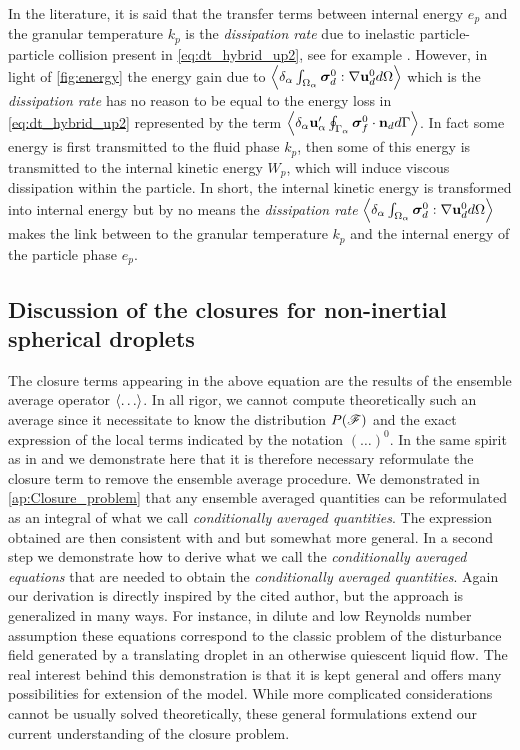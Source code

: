 In the literature, it is said that the transfer terms between internal energy $e_p$ and the granular temperature $k_p$ is the \textit{dissipation rate} due to inelastic particle-particle collision present in \ref{eq:dt_hybrid_up2}, see for example \citet{fox2014multiphase,rao2008introduction}. 
However, in light of \ref{fig:energy} the energy gain due to  $\left<\delta_\alpha \int_{\Omega_{\alpha}} \bm{\sigma}_d^0:\mathbf{\nabla} \textbf{u}_d^0 d\Omega\right>$ which is the \textit{dissipation rate} has no reason to be equal to the energy loss in \ref{eq:dt_hybrid_up2} represented by the term $\left<\delta_\alpha \textbf{u}_\alpha' \oint_{\Gamma_{\alpha}} \bm{\sigma}_f^0 \cdot \textbf{n}_d d\Gamma\right>$. 
In fact some energy is first transmitted to the fluid phase $k_p$, then some of this energy is transmitted to the internal kinetic energy $W_p$, which will induce viscous dissipation within the particle. 
In short, the internal kinetic energy is transformed into internal energy but by no means the \textit{dissipation rate} $\left<\delta_\alpha \int_{\Omega_{\alpha}} \bm{\sigma}_d^0:\mathbf{\nabla} \textbf{u}_d^0 d\Omega\right>$ makes the link between to the granular temperature $k_p$ and the internal energy of the particle phase $e_p$. 



\subsection{Discussion of the closures for non-inertial spherical droplets}

The closure terms appearing in the above equation are the results of the ensemble average operator $\left<\ldots\right>$. 
In all rigor, we cannot compute theoretically such an average since it necessitate to know the distribution $P(\mathscr{F})$ and the exact expression of the local terms indicated by the notation $(\ldots)^0$. 
In the same spirit as in \citet{batchelor1972sedimentation,hinch1977averaged} and \citet{zhang1994averaged} we demonstrate here that it is therefore necessary reformulate the closure term to remove the ensemble average procedure. 
We demonstrated in \ref{ap:Closure_problem} that any ensemble averaged quantities can be reformulated as an integral of what we call \textit{conditionally averaged quantities}. 
The expression obtained are then consistent with \citet{batchelor1972sedimentation,hinch1977averaged} and \citet{zhang1994averaged} but somewhat more general. 
In a second step we demonstrate how to derive what we call the \textit{conditionally averaged equations} that are needed to obtain the \textit{conditionally averaged quantities}. 
Again our derivation is directly inspired by the cited author, but the approach is generalized in many ways. 
For instance, in dilute and low Reynolds number assumption these equations correspond to the classic problem of the disturbance field generated by a translating droplet in an otherwise quiescent liquid flow. 
The real interest behind this demonstration is that it is kept general and offers many possibilities for extension of the model.
While more complicated considerations cannot be usually solved theoretically, these general formulations extend our current understanding of the closure problem. 


